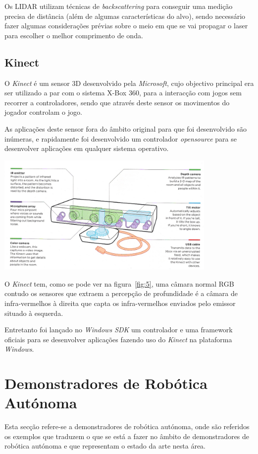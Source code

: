 Os LIDAR utilizam técnicas de \emph{backscattering} para conseguir uma medição
precisa de distância (além de algumas características do alvo), sendo necessário
fazer algumas considerações prévias sobre o meio em que se vai propagar o laser
para escolher o melhor comprimento de onda.


\subsection{Kinect}
O \emph{Kinect} é um sensor 3D desenvolvido pela \emph{Microsoft}, cujo objectivo principal era
ser utilizado a par com o sistema X-Box 360, para a interacção com jogos sem recorrer
a controladores, sendo que através deste sensor os movimentos do jogador controlam o
jogo.

As aplicações deste sensor fora do âmbito original para que foi desenvolvido são inúmeras,
e rapidamente foi desenvolvido um controlador \emph{opensource} para se desenvolver aplicações
em qualquer sistema operativo.

\begin{center}
	\includegraphics[width=0.80\textwidth]{figures/Kinect.png}
	\label{fig:5}
\end{center}

O \emph{Kinect} tem, como se pode ver na figura~\ref{fig:5}, uma câmara normal RGB 
contudo os sensores que extraem a percepção de profundidade é a câmara de infra-vermelhos à direita
que capta os infra-vermelhos enviados pelo emissor situado à esquerda.

Entretanto foi lançado no \emph{Windows SDK} um controlador e uma framework oficiais para se 
desenvolver aplicações fazendo uso do \emph{Kinect} na plataforma \emph{Windows}.

\section{Demonstradores de Robótica Autónoma}
Esta secção refere-se a demonstradores de robótica autónoma, onde são referidos
os exemplos que traduzem o que se está a fazer no âmbito de demonstradores de
robótica autónoma e que representam o estado da arte nesta área.



